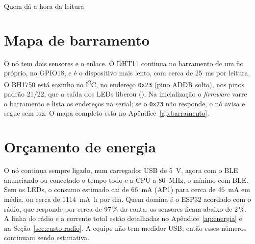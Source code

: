 \begin{decisao}{Quem dá a hora da leitura}
\end{decisao}

\section{Mapa de barramento}
\label{sec:barramento}

O nó tem dois sensores e o enlace. O DHT11 continua no barramento de um
fio próprio, no GPIO18, e é o dispositivo mais lento, com cerca de
\SI{25}{\milli\second} por leitura. O BH1750 está sozinho no
I\textsuperscript{2}C, no endereço \texttt{0x23} (pino ADDR solto), nos
pinos padrão 21/22, que a saída dos LEDs liberou (). Na
inicialização o \emph{firmware} varre o barramento e lista os endereços
na serial; se o \texttt{0x23} não responde, o nó avisa e segue sem luz.
O mapa completo está no Apêndice~\ref{ap:barramento}.

\section{Orçamento de energia}
\label{sec:energia}

O nó continua sempre ligado, num carregador USB de \SI{5}{\volt}, agora
com o BLE anunciando ou conectado o tempo todo e a CPU a
\SI{80}{\mega\hertz}, o mínimo com BLE. Sem os LEDs, o consumo estimado
cai de \SI{66}{\milli\ampere} (AP1) para cerca de
\SI{46}{\milli\ampere} em média, ou cerca de
\SI{1114}{\milli\ampere\hour} por dia. Quem domina é o ESP32 acordado com
o rádio, que responde por cerca de 97\,\% da conta; os sensores ficam
abaixo de 2\,\%. A linha do rádio e a corrente total estão detalhadas no
Apêndice~\ref{ap:energia} e na Seção~\ref{sec:custo-radio}. A equipe não
tem medidor USB, então esses números continuam sendo estimativa.

